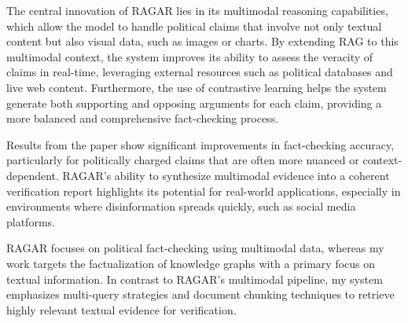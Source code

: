 The central innovation of RAGAR lies in its multimodal reasoning capabilities, which allow the model to handle political claims that involve not only textual content but also visual data, such as images or charts.
By extending RAG to this multimodal context, the system improves its ability to assess the veracity of claims in real-time, leveraging external resources such as political databases and live web content.
Furthermore, the use of contrastive learning helps the system generate both supporting and opposing arguments for each claim, providing a more balanced and comprehensive fact-checking process.

Results from the paper show significant improvements in fact-checking accuracy, particularly for politically charged claims that are often more nuanced or context-dependent.
RAGAR's ability to synthesize multimodal evidence into a coherent verification report highlights its potential for real-world applications, especially in environments where disinformation spreads quickly, such as social media platforms.

RAGAR focuses on political fact-checking using multimodal data, whereas my work targets the factualization of knowledge graphs with a primary focus on textual information.
In contrast to RAGAR’s multimodal pipeline, my system emphasizes multi-query strategies and document chunking techniques to retrieve highly relevant textual evidence for verification.